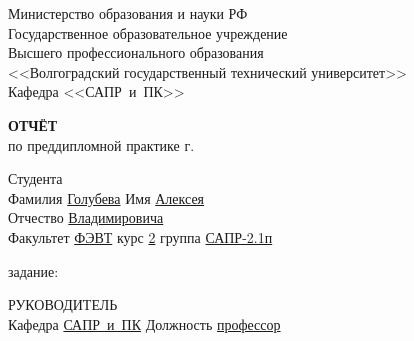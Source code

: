 \documentclass[a4paper, 14pt]{extreport}
\begin{document}
    \begin{titlepage}
        \begin{center}
            Министерство образования и науки РФ \\
            Государственное образовательное учреждение\\
            Высшего профессионального образования\\
            <<Волгоградский государственный технический университет>>\\
            Кафедра <<САПР~и~ПК>>
        \end{center}
        \vspace{2.0cm}
        \begin{center}
            \large \textbf{ОТЧЁТ} \\
            по преддипломной практике \the\year г.
        \end{center}
        \begin{flushleft}
            Студента\\
            Фамилия \underline{Голубева\hspace{3.1cm}} 
            Имя \underline{Алексея\hspace{2.1cm}}\\
            Отчество \underline{Владимировича\hspace{1.6cm}}\\
            Факультет \underline{ФЭВТ\hspace{3.45cm}} курс \underline{2\hspace{1.5cm}} 
            группа \underline{САПР-2.1п\hspace{1.9cm}}\\
        \end{flushleft}
        \vspace{1.0cm}
         задание: \underline{\hspace{22.3em}}\\
        \underline{\hspace{\textwidth}}
        \underline{\hspace{\textwidth}}
        \underline{\hspace{\textwidth}}
        \underline{\hspace{\textwidth}}
        \vspace{2.0cm}
        \begin{flushleft}
            РУКОВОДИТЕЛЬ\\
            Кафедра \underline{САПР~и~ПК\hspace{2.4cm}} Должность \underline{профессор\hspace{2.8cm}} \\

\end{flushleft}
\end{titlepage}
\end{document}
